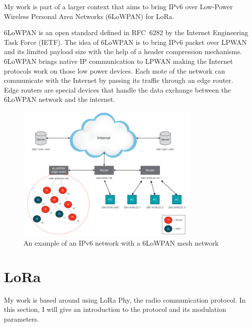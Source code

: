 My work is part of a larger context that aims to bring IPv6 over Low-Power
Wireless Personal Area Networks (6LoWPAN) for LoRa.

6LoWPAN is an open standard defined in RFC~6282 by the Internet Engineering
Task Force (IETF).
The idea of 6LoWPAN is to bring IPv6 packet over LPWAN and its limited payload
size with the help of a header compression mechanisms.
6LoWPAN brings native IP communication to LPWAN making the Internet protocols
work on those low power devices.
Each mote of the network can communicate with the Internet by passing its
traffic through an edge router.
Edge routers are special devices that handle the data exchange between the
6LoWPAN network and the internet.

\begin{figure}[H]
  \centering
  \includegraphics[width=0.8\textwidth]{thesis.tex/chapters/context/fig/6lowpan.png}
  \caption{An example of an IPv6 network with a 6LoWPAN mesh network\cite{olsson20146lowpan}\label{fig:6lowpan}}
\end{figure}


\section{LoRa\label{section:lora}}

My work is based around using LoRa Phy, the radio communication protocol.
In this section, I will give an introduction to the protocol and its
modulation parameters.

